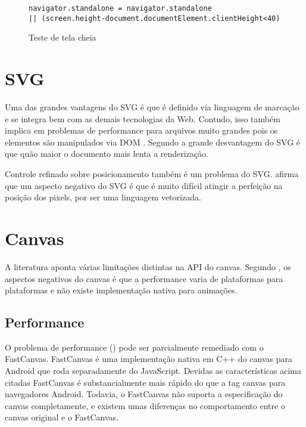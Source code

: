 \begin{figure}[H]
\centering
\begin{verbatim}
navigator.standalone = navigator.standalone 
|| (screen.height-document.documentElement.clientHeight<40)
\end{verbatim}
\caption{Teste de tela cheia}
\label{fig:fixJSTypes}
\end{figure}

\section{SVG}

Uma das grandes vantagens do SVG é que é definido via linguagem
de marcação e se integra bem com as demais tecnologias da Web.
Contudo, isso também implica em problemas de performance para
arquivos muito grandes pois os elementos são manipulados via DOM
. Segundo \citet{html5mostwanted} a
grande desvantagem do SVG é que quão maior o documento mais lenta a
renderização.

Controle refinado sobre posicionamento também é um problema do SVG.
\citet{html5mostwanted} afirma que um aspecto negativo do SVG é que é
muito difícil atingir a perfeição na posição dos pixels, por ser
uma linguagem vetorizada.

\section{Canvas}

A literatura aponta várias limitações distintas na API do canvas.
Segundo \autocite{html5mostwanted}, os aspectos negativos do canvas é
que a performance varia de plataformas para plataformas e não existe
implementação nativa para animações.

\subsection{Performance}

O problema de performance () pode
ser parcialmente remediado com o FastCanvas. FastCanvas é uma
implementação nativa em C++ do canvas para Android que roda
separadamente do JavaScript. Devidas as características acima citadas
FastCanvas é substancialmente mais rápido do que a tag canvas para
navegadores Android. Todavia, o FastCanvas não suporta a
especificação do canvas completamente, e existem umas diferenças no
comportamento entre o canvas original e o FastCanvas.


